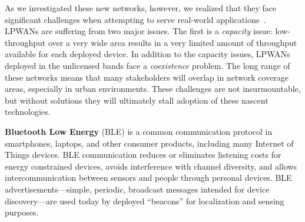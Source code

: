 \documentclass[11pt]{article} %
\begin{document}
As we investigated these new networks, however, we realized that they face
significant challenges when attempting to serve real-world
applications~\cite{ghena19lpwans}.
%
%
LPWANs are suffering from two major issues.
%
The first is a \textit{capacity} issue: low-throughput over a very wide area
results in a very limited amount of throughput available for each deployed
device.
%
In addition to the capacity issues, LPWANs deployed in the unlicensed bands
face a \textit{coexistence} problem. The long range of these networks means
that many stakeholders will overlap in network coverage areas, especially in
urban environments.
%
These challenges are not insurmountable, but without solutions they will
ultimately stall adoption of these nascent technologies.
%

\textbf{Bluetooth Low Energy} (BLE) is a common communication protocol in
smartphones, laptops, and other consumer products, including many Internet of
Things devices.
%
BLE communication reduces or eliminates listening costs for energy constrained
devices, avoids interference with channel diversity, and allows
intercommunication between sensors and people through personal devices.
%
BLE advertisements---simple, periodic, broadcast messages intended for device
discovery---are used today by deployed ``beacons'' for localization and sensing
purposes.
\end{document}
